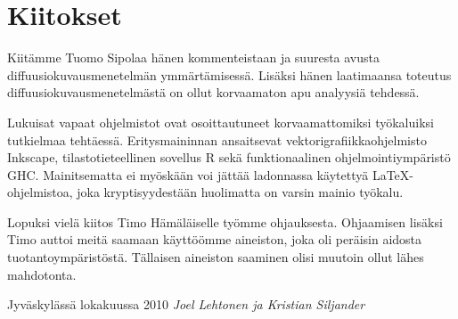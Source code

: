 
\chapter*{Kiitokset}

Kiitämme Tuomo Sipolaa hänen kommenteistaan ja suuresta avusta
diffuusiokuvausmenetelmän ymmärtämisessä. Lisäksi hänen laatimaansa
toteutus diffuusiokuvausmenetelmästä on ollut korvaamaton apu
analyysiä tehdessä.

Lukuisat vapaat ohjelmistot ovat osoittautuneet korvaamattomiksi
työkaluiksi tutkielmaa tehtäessä. Eritysmaininnan ansaitsevat
vektorigrafiikkaohjelmisto Inkscape, tilastotieteellinen sovellus R
sekä funktionaalinen ohjelmointiympäristö GHC. Mainitsematta ei
myöskään voi jättää ladonnassa käytettyä \LaTeX-ohjelmistoa,
joka kryptisyydestään huolimatta on varsin mainio työkalu.

Lopuksi vielä kiitos Timo Hämäläiselle työmme ohjauksesta. Ohjaamisen
lisäksi Timo auttoi meitä saamaan käyttöömme aineiston, joka oli
peräisin aidosta tuotantoympäristöstä. Tällaisen aineiston saaminen
olisi muutoin ollut lähes mahdotonta.

\vskip 1cm
Jyväskylässä lokakuussa 2010
\vskip 0.5cm
\textit{Joel Lehtonen ja Kristian Siljander}
